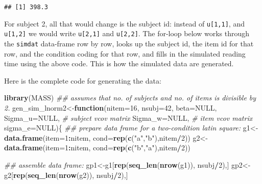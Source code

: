 \documentclass[12pt,]{krantz}
\newenvironment{Shaded}{\begin{snugshade}}{\end{snugshade}}
\newcommand{\CommentTok}[1]{\textcolor[rgb]{0.56,0.35,0.01}{\textit{#1}}}
\newcommand{\ControlFlowTok}[1]{\textcolor[rgb]{0.13,0.29,0.53}{\textbf{#1}}}
\newcommand{\DataTypeTok}[1]{\textcolor[rgb]{0.13,0.29,0.53}{#1}}
\newcommand{\DecValTok}[1]{\textcolor[rgb]{0.00,0.00,0.81}{#1}}
\newcommand{\KeywordTok}[1]{\textcolor[rgb]{0.13,0.29,0.53}{\textbf{#1}}}
\newcommand{\NormalTok}[1]{#1}
\newcommand{\OperatorTok}[1]{\textcolor[rgb]{0.81,0.36,0.00}{\textbf{#1}}}
\newcommand{\OtherTok}[1]{\textcolor[rgb]{0.56,0.35,0.01}{#1}}
\newcommand{\StringTok}[1]{\textcolor[rgb]{0.31,0.60,0.02}{#1}}
\begin{document}
\begin{verbatim}
## [1] 398.3
\end{verbatim}

For subject 2, all that would change is the subject id: instead of \texttt{u{[}1,1{]}}, and \texttt{u{[}1,2{]}} we would write \texttt{u{[}2,1{]}} and \texttt{u{[}2,2{]}}. The for-loop below works through the \texttt{simdat} data-frame row by row, looks up the subject id, the item id for that row, and the condition coding for that row, and fills in the simulated reading time using the above code. This is how the simulated data are generated.

Here is the complete code for generating the data:

\begin{Shaded}
\begin{Highlighting}[]
\KeywordTok{library}\NormalTok{(MASS)}
\CommentTok{## assumes that no. of subjects and no. of items is divisible by 2.}
\NormalTok{gen_sim_lnorm2<-}\ControlFlowTok{function}\NormalTok{(}\DataTypeTok{nitem=}\DecValTok{16}\NormalTok{,}
                         \DataTypeTok{nsubj=}\DecValTok{42}\NormalTok{,}
                         \DataTypeTok{beta=}\OtherTok{NULL}\NormalTok{,}
                         \DataTypeTok{Sigma_u=}\OtherTok{NULL}\NormalTok{, }\CommentTok{# subject vcov matrix}
                         \DataTypeTok{Sigma_w=}\OtherTok{NULL}\NormalTok{, }\CommentTok{# item vcov matrix}
                         \DataTypeTok{sigma_e=}\OtherTok{NULL}\NormalTok{)\{}
  \CommentTok{## prepare data frame for a two-condition latin square:}
\NormalTok{  g1<-}\KeywordTok{data.frame}\NormalTok{(}\DataTypeTok{item=}\DecValTok{1}\OperatorTok{:}\NormalTok{nitem,}
                 \DataTypeTok{cond=}\KeywordTok{rep}\NormalTok{(}\KeywordTok{c}\NormalTok{(}\StringTok{"a"}\NormalTok{,}\StringTok{"b"}\NormalTok{),nitem}\OperatorTok{/}\DecValTok{2}\NormalTok{))}
\NormalTok{  g2<-}\KeywordTok{data.frame}\NormalTok{(}\DataTypeTok{item=}\DecValTok{1}\OperatorTok{:}\NormalTok{nitem,}
                 \DataTypeTok{cond=}\KeywordTok{rep}\NormalTok{(}\KeywordTok{c}\NormalTok{(}\StringTok{"b"}\NormalTok{,}\StringTok{"a"}\NormalTok{),nitem}\OperatorTok{/}\DecValTok{2}\NormalTok{))}

  
  \CommentTok{## assemble data frame:}
\NormalTok{  gp1<-g1[}\KeywordTok{rep}\NormalTok{(}\KeywordTok{seq_len}\NormalTok{(}\KeywordTok{nrow}\NormalTok{(g1)), }
\NormalTok{              nsubj}\OperatorTok{/}\DecValTok{2}\NormalTok{),]}
\NormalTok{  gp2<-g2[}\KeywordTok{rep}\NormalTok{(}\KeywordTok{seq_len}\NormalTok{(}\KeywordTok{nrow}\NormalTok{(g2)), }
\NormalTok{              nsubj}\OperatorTok{/}\DecValTok{2}\NormalTok{),]}
  

\end{Highlighting}
\end{Shaded}
\end{document}
